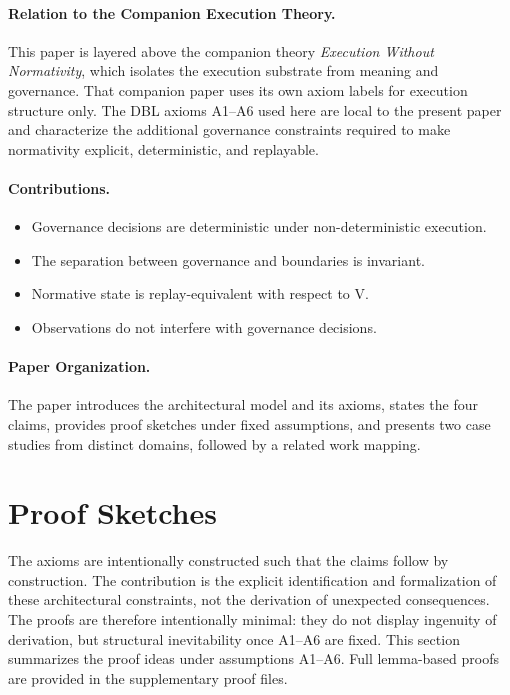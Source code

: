 \documentclass[11pt]{article}
\begin{document}
\paragraph{Relation to the Companion Execution Theory.}
This paper is layered above the companion theory \emph{Execution Without Normativity}, which isolates the execution substrate from meaning and governance. That companion paper uses its own axiom labels for execution structure only. The DBL axioms A1--A6 used here are local to the present paper and characterize the additional governance constraints required to make normativity explicit, deterministic, and replayable.

\paragraph{Contributions.}
\begin{itemize}
  \item Governance decisions are deterministic under non-deterministic execution.
  \item The separation between governance and boundaries is invariant.
  \item Normative state is replay-equivalent with respect to V.
  \item Observations do not interfere with governance decisions.
\end{itemize}

\paragraph{Paper Organization.}
The paper introduces the architectural model and its axioms, states the four claims, provides proof sketches under fixed assumptions, and presents two case studies from distinct domains, followed by a related work mapping.






\section{Proof Sketches}

The axioms are intentionally constructed such that the claims follow by construction. The contribution is the explicit identification and formalization of these architectural constraints, not the derivation of unexpected consequences. The proofs are therefore intentionally minimal: they do not display ingenuity of derivation, but structural inevitability once A1--A6 are fixed. This section summarizes the proof ideas under assumptions A1--A6. Full lemma-based proofs are provided in the supplementary proof files.
\end{document}
